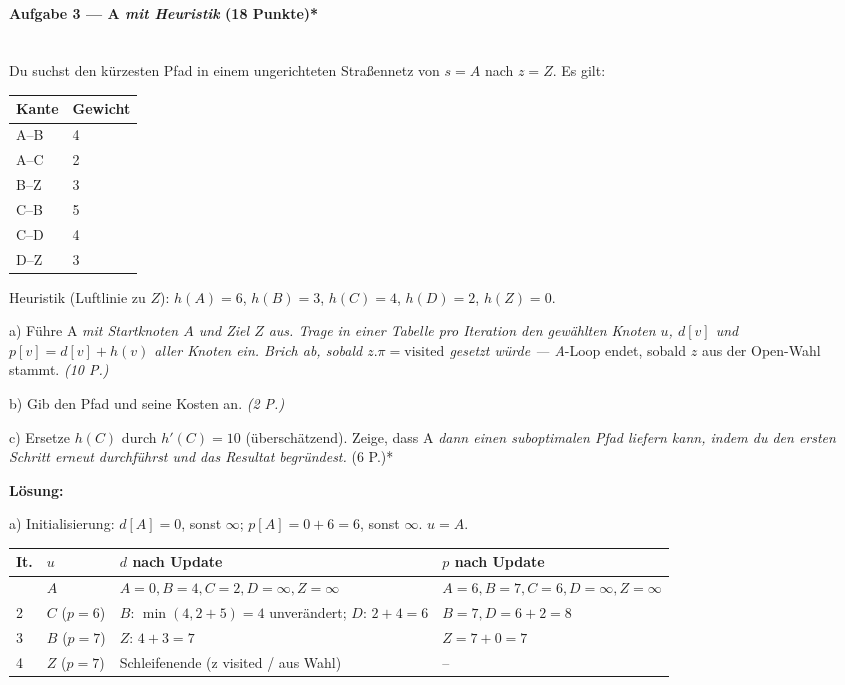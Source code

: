 \documentclass[11pt, a4paper]{article}
\begin{document}
\paragraph{Aufgabe 3 — A\textit{ mit Heuristik }(18 Punkte)*}\mbox{}\\[2pt]

Du suchst den kürzesten Pfad in einem ungerichteten Straßennetz von $s=A$ nach $z=Z$. Es gilt:



{\small
\begin{tabularx}{\linewidth}{XX}
\hline
\rowcolor{tableheadbg}
{\color{white}\textbf{Kante}} & {\color{white}\textbf{Gewicht}} \\[2pt]
\hline
\endhead
\hline
\endfoot
A–B & 4 \\
A–C & 2 \\
B–Z & 3 \\
C–B & 5 \\
C–D & 4 \\
D–Z & 3 \\
\end{tabularx}
}


Heuristik (Luftlinie zu $Z$): $h(A)=6$, $h(B)=3$, $h(C)=4$, $h(D)=2$, $h(Z)=0$.


a) Führe A\textit{ mit Startknoten $A$ und Ziel $Z$ aus. Trage in einer Tabelle pro Iteration den gewählten Knoten $u$, $d[v]$ und $p[v]=d[v]+h(v)$ aller Knoten ein. Brich ab, sobald $z.\pi=\text{visited}$ gesetzt würde — A}-Loop endet, sobald $z$ aus der Open-Wahl stammt. \textit{(10 P.)}


b) Gib den Pfad und seine Kosten an. \textit{(2 P.)}


c) Ersetze $h(C)$ durch $h'(C)=10$ (überschätzend). Zeige, dass A\textit{ dann einen suboptimalen Pfad liefern kann, indem du den ersten Schritt erneut durchführst und das Resultat begründest. }(6 P.)*


\textbf{Lösung:}


a) Initialisierung: $d[A]=0$, sonst $\infty$; $p[A]=0+6=6$, sonst $\infty$. $u=A$.



{\small
\begin{tabularx}{\linewidth}{XXXX}
\hline
\rowcolor{tableheadbg}
{\color{white}\textbf{It.}} & {\color{white}\textbf{$u$}} & {\color{white}\textbf{$d$ nach Update}} & {\color{white}\textbf{$p$ nach Update}} \\[2pt]
\hline
\endhead
\hline
\endfoot
1 & $A$ & $A{=}0,B{=}4,C{=}2,D{=}\infty,Z{=}\infty$ & $A{=}6,B{=}7,C{=}6,D{=}\infty,Z{=}\infty$ \\
2 & $C$ ($p=6$) & $B$: $\min(4, 2+5)=4$ unverändert; $D$: $2+4=6$ & $B{=}7,D{=}6+2=8$ \\
3 & $B$ ($p=7$) & $Z$: $4+3=7$ & $Z{=}7+0=7$ \\
4 & $Z$ ($p=7$) & Schleifenende (z visited / aus Wahl) & – \\
\end{tabularx}
}
\end{document}
